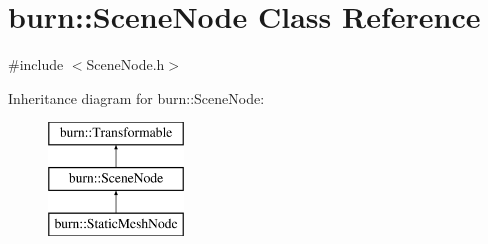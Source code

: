 \hypertarget{classburn_1_1_scene_node}{\section{burn\-:\-:Scene\-Node Class Reference}
\label{classburn_1_1_scene_node}
}


{\ttfamily \#include $<$Scene\-Node.\-h$>$}

Inheritance diagram for burn\-:\-:Scene\-Node\-:\begin{figure}[H]
\begin{center}
\leavevmode
\includegraphics[height=3.000000cm]{classburn_1_1_scene_node}
\end{center}
\end{figure}
